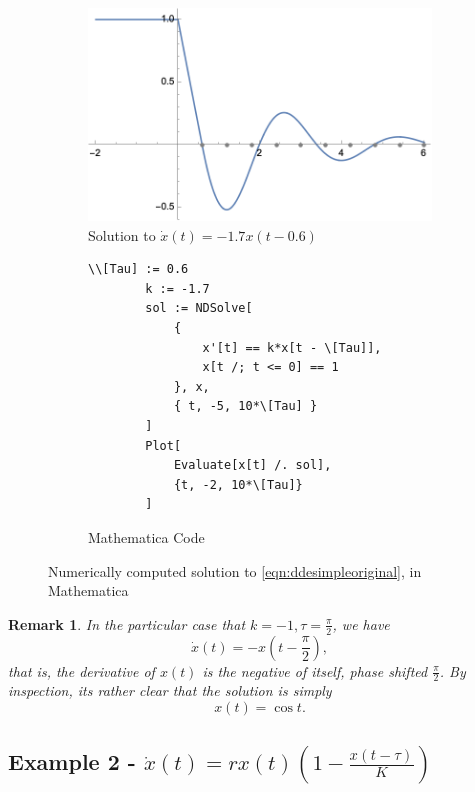 \documentclass[12pt]{article}
\newtheorem{remark}{Remark}
\begin{document}
\begin{figure}[!ht]
    \centering
    \begin{subfigure}{.5\textwidth}
      \centering
      \includegraphics[width=.9\linewidth]{figures/simpledde.png}
      \caption{Solution to $\dot{x}(t) = -1.7x(t - 0.6)$}
      \label{fig:simpleddeimage}
    \end{subfigure}%
    \begin{subfigure}{.3\textwidth}
      \begin{lstlisting}[basicstyle=\footnotesize]
        \\[Tau] := 0.6
        k := -1.7
        sol := NDSolve[
            {
                x'[t] == k*x[t - \[Tau]], 
                x[t /; t <= 0] == 1
            }, x, 
            { t, -5, 10*\[Tau] }
        ]
        Plot[
            Evaluate[x[t] /. sol], 
            {t, -2, 10*\[Tau]}
        ]
      \end{lstlisting}
      \caption{Mathematica Code}
      \label{fig:sub2}
    \end{subfigure}
    \caption{Numerically computed solution to \cref{eqn:ddesimpleoriginal}, in Mathematica}
    \label{fig:mathematicamagicsimple}
\end{figure}

\begin{remark}
    In the particular case that $k = -1, \tau = \frac{\pi}{2}$, we have \[
    \dot{x}(t) = -x(t - \frac{\pi}{2}),
    \]
    that is, the derivative of $x(t)$ is the negative of itself, phase shifted $\frac{\pi}{2}$. By inspection, its rather clear that the solution is simply \[
    x(t) = \cos t.    
    \]
\end{remark}

\subsection{Example 2 -  $\dot{x}(t) = rx(t)(1 - \frac{x(t-\tau)}{K})$}
\end{document}
